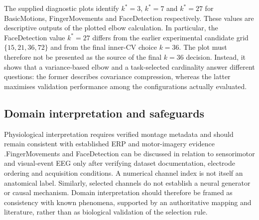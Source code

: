 The supplied diagnostic plots identify $k^*=3$, $k^*=7$ and $k^*=27$ for BasicMotions, FingerMovements and FaceDetection respectively. These values are descriptive outputs of the plotted elbow calculation. In particular, the FaceDetection value $k^*=27$ differs from the earlier experimental candidate grid $\{15,21,36,72\}$ and from the final inner-CV choice $k=36$. The plot must therefore not be presented as the source of the final $k=36$ decision. Instead, it shows that a variance-based elbow and a task-selected cardinality answer different questions: the former describes covariance compression, whereas the latter maximises validation performance among the configurations actually evaluated.

\subsection{Domain interpretation and safeguards}
Physiological interpretation requires verified montage metadata and should
remain consistent with established ERP and motor-imagery evidence
\citep{luck2014erp,ramoser2000csp,lotte2018bci}.FingerMovements and FaceDetection can be discussed in relation to sensorimotor and visual-event EEG only after verifying dataset documentation, electrode ordering and acquisition conditions. A numerical channel index is not itself an anatomical label. Similarly, selected channels do not establish a neural generator or causal mechanism. Domain interpretation should therefore be framed as consistency with known phenomena, supported by an authoritative mapping and literature, rather than as biological validation of the selection rule.
